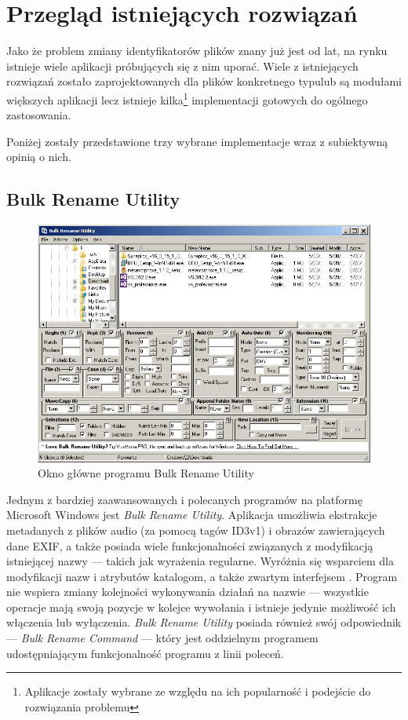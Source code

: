 \chapter{Przegląd istniejących rozwiązań}
\par
Jako że problem zmiany identyfikatorów plików znany już jest od lat, na rynku istnieje wiele aplikacji próbujących się z nim uporać. Wiele z istniejących rozwiązań zostało zaprojektowanych dla plików konkretnego typulub są modułami większych aplikacji lecz istnieje kilka\footnote{Aplikacje zostały wybrane ze względu na ich popularność i podejście do rozwiązania problemu} implementacji gotowych do ogólnego zastosowania.
\par
Poniżej zostały przedstawione trzy wybrane implementacje wraz z subiektywną opinią o nich.

\section{Bulk Rename Utility}
\begin{figure}[h]
\begin{center}
\includegraphics[scale=0.75]{img/bulkrename_window.png}
\end{center}
\caption{Okno główne programu Bulk Rename Utility}
\end{figure}

\par
Jednym z bardziej zaawansowanych i polecanych programów na platformę Microsoft Windows jest \textit{Bulk Rename Utility}. Aplikacja umożliwia ekstrakcje metadanych z plików audio (za pomocą tagów ID3v1) i obrazów zawierających dane EXIF, a także posiada wiele funkcjonalności związanych z modyfikacją istniejącej nazwy --- takich jak wyrażenia regularne.
Wyróżnia się wsparciem dla modyfikacji nazw i atrybutów katalogom, a także zwartym interfejsem .
Program nie wspiera zmiany kolejności wykonywania działań na nazwie --- wszystkie operacje mają swoją pozycje w kolejce wywołania i istnieje jedynie możliwość ich włączenia lub wyłączenia.
\textit{Bulk Rename Utility} posiada również swój odpowiednik --- \textit{Bulk Rename Command} --- który jest oddzielnym programem udostępniającym funkcjonalność programu z linii poleceń.

